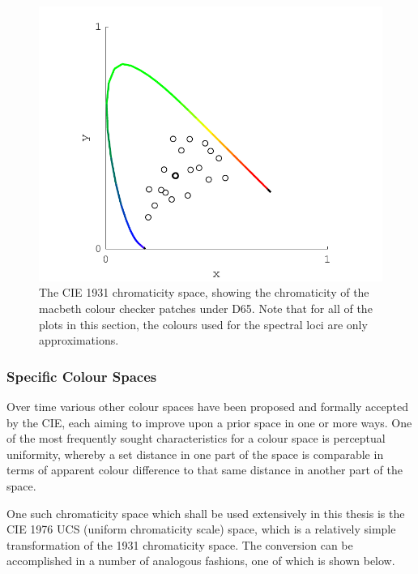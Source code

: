 
\begin{figure}[htbp]
\includegraphics[max width=\textwidth]{figs/LitRev/ColorimetryDemo1.pdf}
\caption{The \gls{CIE} 1931 chromaticity space, showing the chromaticity of the macbeth colour checker patches under D65. Note that for all of the plots in this section, the colours used for the spectral loci are only approximations.}
\label{fig:1931}
\end{figure}

\subsubsection{Specific Colour Spaces}

Over time various other colour spaces have been proposed and formally accepted by the \gls{CIE}, each aiming to improve upon a prior space in one or more ways. One of the most frequently sought characteristics for a colour space is perceptual uniformity, whereby a set distance in one part of the space is comparable in terms of apparent colour difference to that same distance in another part of the space.

One such chromaticity space which shall be used extensively in this thesis is the \gls{CIE} 1976 UCS (uniform chromaticity scale) space, which is a relatively simple transformation of the 1931 chromaticity space. The conversion can be accomplished in a number of analogous fashions, one of which is shown below.

